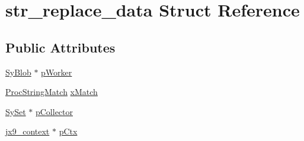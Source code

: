 \hypertarget{structstr__replace__data}{\section{str\-\_\-replace\-\_\-data Struct Reference}
\label{d1/d2f/structstr__replace__data}
}
\subsection*{Public Attributes}
\begin{DoxyCompactItemize}
\item 
\hyperlink{struct_sy_blob}{Sy\-Blob} $\ast$ \hyperlink{structstr__replace__data_ac00d5da5bceebdd3b8a602c809b37819}{p\-Worker}
\item 
\hyperlink{unqlite_8c_a7672b71a18e530f90a04a50ceebf7656}{Proc\-String\-Match} \hyperlink{structstr__replace__data_a702650ba2d49dd96bedbb9ba754d5760}{x\-Match}
\item 
\hyperlink{struct_sy_set}{Sy\-Set} $\ast$ \hyperlink{structstr__replace__data_afabcfd4e57bd32f1e50dbb3360665218}{p\-Collector}
\item 
\hyperlink{structjx9__context}{jx9\-\_\-context} $\ast$ \hyperlink{structstr__replace__data_a54d044610592602295a97226f30dceef}{p\-Ctx}
\end{DoxyCompactItemize}


